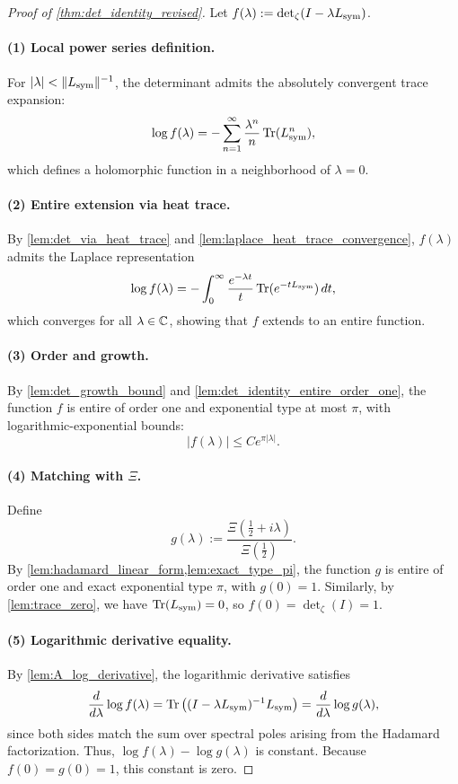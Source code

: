 \begin{proof}[Proof of \cref{thm:det_identity_revised}]
Let \( f(\lambda) := \det\nolimits_\zeta(I - \lambda L_{\mathrm{sym}}) \).

\paragraph{(1) Local power series definition.}
For \( |\lambda| < \|L_{\mathrm{sym}}\|^{-1} \), the determinant admits the absolutely convergent trace expansion:
\[
\log f(\lambda) = - \sum_{n=1}^\infty \frac{\lambda^n}{n} \operatorname{Tr}(L_{\mathrm{sym}}^n),
\]
which defines a holomorphic function in a neighborhood of \( \lambda = 0 \).

\paragraph{(2) Entire extension via heat trace.}
By \cref{lem:det_via_heat_trace} and \cref{lem:laplace_heat_trace_convergence}, \( f(\lambda) \) admits the Laplace representation
\[
\log f(\lambda) = - \int_0^\infty \frac{e^{-\lambda t}}{t} \operatorname{Tr}(e^{-t L_{\mathrm{sym}}}) \, dt,
\]
which converges for all \( \lambda \in \mathbb{C} \), showing that \( f \) extends to an entire function.

\paragraph{(3) Order and growth.}
By \cref{lem:det_growth_bound} and \cref{lem:det_identity_entire_order_one}, the function \( f \) is entire of order one and exponential type at most \( \pi \), with logarithmic-exponential bounds:
\[
|f(\lambda)| \le C e^{\pi |\lambda|}.
\]

\paragraph{(4) Matching with \(\Xi\).}
Define
\[
g(\lambda) := \frac{\Xi\left( \tfrac{1}{2} + i\lambda \right)}{\Xi\left( \tfrac{1}{2} \right)}.
\]
By \cref{lem:hadamard_linear_form,lem:exact_type_pi}, the function \( g \) is entire of order one and exact exponential type \( \pi \), with \( g(0) = 1 \). Similarly, by \cref{lem:trace_zero}, we have \( \operatorname{Tr}(L_{\mathrm{sym}}) = 0 \), so \( f(0) = \det\nolimits_\zeta(I) = 1 \).

\paragraph{(5) Logarithmic derivative equality.}
By \cref{lem:A_log_derivative}, the logarithmic derivative satisfies
\[
\frac{d}{d\lambda} \log f(\lambda)
= \operatorname{Tr}\left( (I - \lambda L_{\mathrm{sym}})^{-1} L_{\mathrm{sym}} \right)
= \frac{d}{d\lambda} \log g(\lambda),
\]
since both sides match the sum over spectral poles arising from the Hadamard factorization. Thus, \( \log f(\lambda) - \log g(\lambda) \) is constant. Because \( f(0) = g(0) = 1 \), this constant is zero.


\end{proof}

